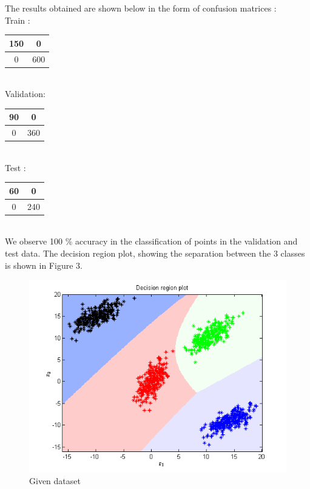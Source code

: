 \documentclass{article}
\begin{document}
\begin{flushleft}
The results obtained are shown below in the form of confusion matrices :\\[10pt]

Train : \\[10pt]


\begin{tabular}{|c|c|}
\hline
150 & 0\\ 

\hline
0 & 600 \\ \hline

\end{tabular}\\[10pt]

Validation: \\[10pt]

\begin{tabular}{|c|c|} 
\hline
90 & 0\\ \hline
0 & 360 \\ \hline
\end{tabular}\\[10pt]

Test : \\[10pt]

\begin{tabular}{|c|c|} \hline 
60 & 0\\ \hline
0 & 240 \\ \hline 
 \end{tabular}\\[10pt]

We observe 100 \% accuracy in the classification of points in the validation and test data. The decision region plot, showing the separation between the 3 classes is shown in Figure 3.


\begin{figure}[H]
\centering
\includegraphics[width=\linewidth]{Classification/linearlySeparable/decn_region_bayes.png}
\caption{Given dataset}
\end{figure}


\end{flushleft}
\end{document}

